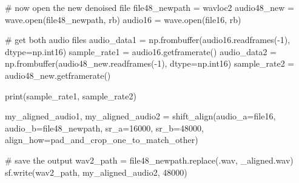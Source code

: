 \documentclass[
  letterpaper,
  DIV=11,
  numbers=noendperiod]{scrreprt}
\newenvironment{Shaded}{\begin{snugshade}}{\end{snugshade}}
\newcommand{\BuiltInTok}[1]{\textcolor[rgb]{0.00,0.23,0.31}{#1}}
\newcommand{\CommentTok}[1]{\textcolor[rgb]{0.37,0.37,0.37}{#1}}
\newcommand{\DecValTok}[1]{\textcolor[rgb]{0.68,0.00,0.00}{#1}}
\newcommand{\NormalTok}[1]{\textcolor[rgb]{0.00,0.23,0.31}{#1}}
\newcommand{\OperatorTok}[1]{\textcolor[rgb]{0.37,0.37,0.37}{#1}}
\newcommand{\StringTok}[1]{\textcolor[rgb]{0.13,0.47,0.30}{#1}}
\begin{document}
\begin{Shaded}
\begin{Highlighting}[]
    \CommentTok{\# now open the new denoised file}
\NormalTok{    file48\_newpath }\OperatorTok{=}\NormalTok{ wavloc2}
\NormalTok{    audio48\_new }\OperatorTok{=}\NormalTok{ wave.}\BuiltInTok{open}\NormalTok{(file48\_newpath, }\StringTok{\textquotesingle{}rb\textquotesingle{}}\NormalTok{)}
\NormalTok{    audio16 }\OperatorTok{=}\NormalTok{ wave.}\BuiltInTok{open}\NormalTok{(file16, }\StringTok{\textquotesingle{}rb\textquotesingle{}}\NormalTok{)}

    \CommentTok{\# get both audio files  }
\NormalTok{    audio\_data1 }\OperatorTok{=}\NormalTok{ np.frombuffer(audio16.readframes(}\OperatorTok{{-}}\DecValTok{1}\NormalTok{), dtype}\OperatorTok{=}\NormalTok{np.int16)}
\NormalTok{    sample\_rate1 }\OperatorTok{=}\NormalTok{ audio16.getframerate()}
\NormalTok{    audio\_data2 }\OperatorTok{=}\NormalTok{ np.frombuffer(audio48\_new.readframes(}\OperatorTok{{-}}\DecValTok{1}\NormalTok{), dtype}\OperatorTok{=}\NormalTok{np.int16)}
\NormalTok{    sample\_rate2 }\OperatorTok{=}\NormalTok{ audio48\_new.getframerate()}

    \BuiltInTok{print}\NormalTok{(sample\_rate1, sample\_rate2)}

\NormalTok{    my\_aligned\_audio1, my\_aligned\_audio2 }\OperatorTok{=}\NormalTok{ shift\_align(audio\_a}\OperatorTok{=}\NormalTok{file16, audio\_b}\OperatorTok{=}\NormalTok{file48\_newpath, sr\_a}\OperatorTok{=}\DecValTok{16000}\NormalTok{, sr\_b}\OperatorTok{=}\DecValTok{48000}\NormalTok{, align\_how}\OperatorTok{=}\StringTok{\textquotesingle{}pad\_and\_crop\_one\_to\_match\_other\textquotesingle{}}\NormalTok{)}

    \CommentTok{\# save the output}
\NormalTok{    wav2\_path }\OperatorTok{=}\NormalTok{ file48\_newpath.replace(}\StringTok{\textquotesingle{}.wav\textquotesingle{}}\NormalTok{, }\StringTok{\textquotesingle{}\_aligned.wav\textquotesingle{}}\NormalTok{)}
\NormalTok{    sf.write(wav2\_path, my\_aligned\_audio2, }\DecValTok{48000}\NormalTok{)}
\end{Highlighting}
\end{Shaded}
\end{document}
